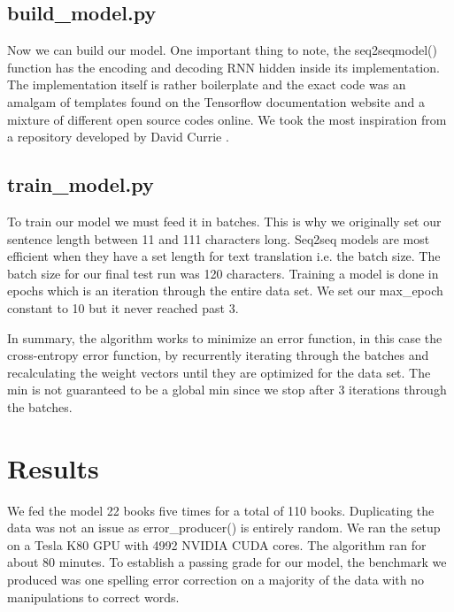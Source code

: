 \documentclass[11pt,a4paper]{scrartcl}
\theoremstyle{definition}
\begin{document}
\subsection{build\_model.py}
Now we can build our model. One important thing to note, the seq2seqmodel() function has the encoding and decoding RNN hidden inside its implementation. The implementation itself is rather boilerplate and the exact code was an amalgam of templates found on the Tensorflow documentation website and a mixture of different open source codes online. We took the most inspiration from a repository developed by David Currie \cite{Currie}. 

\vspace{1em}
\subsection{train\_model.py}
To train our model we must feed it in batches. This is why we originally set our sentence length between 11 and 111 characters long. Seq2seq models are most efficient when they have a set length for text translation i.e. the batch size. The batch size for our final test run was 120 characters. Training a model is done in epochs which is an iteration through the entire data set. We set our max\_epoch constant to 10 but it never reached past 3.\newline


\vspace{1em}
In summary, the algorithm works to minimize an error function, in this case the cross-entropy error function, by recurrently iterating through the batches and recalculating the weight vectors until they are optimized for the data set. The min is not guaranteed to be a global min since we stop after 3 iterations through the batches.

\section{Results}
We fed the model 22 books five times for a total of 110 books. Duplicating the data was not an issue as error\_producer() is entirely random. We ran the setup on a Tesla K80 GPU with 4992 NVIDIA CUDA cores. The algorithm ran for about 80 minutes. To establish a passing grade for our model, the benchmark we produced was one spelling error correction on a majority of the data with no manipulations to correct words.\newline
\end{document}
